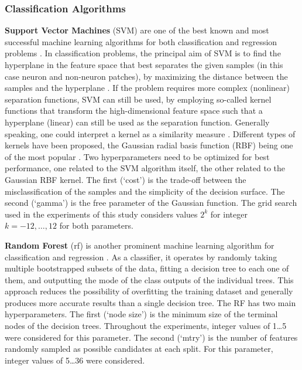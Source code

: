 \subsubsection{Classification Algorithms}
\label{subsubsec:classifiers}
{\bf Support Vector Machines} (SVM) are one of the best known and most successful machine learning algorithms for both classification and regression problems \cite{boser1992training, vapnik1998statistical, vapnik2013nature, bishop2006pattern}. In classification problems, the principal aim of SVM is to find the hyperplane in the feature space that best separates the given samples (in this case neuron and non-neuron patches), by maximizing the distance between the samples and the hyperplane \cite{burges1998tutorial}. If the problem requires more complex (nonlinear) separation functions, SVM can still be used, by employing so-called kernel functions that transform the high-dimensional feature space such that a hyperplane (linear) can still be used as the separation function. Generally speaking, one could interpret a kernel as a similarity measure \cite{vert2004primer}. Different types of kernels have been proposed, the Gaussian radial basis function (RBF) being one of the most popular \cite{cristianini2000introduction}. Two hyperparameters need to be optimized for best performance, one related to the SVM algorithm itself, the other related to the Gaussian RBF kernel. The first (`cost') is the trade-off between the misclassification of the samples and the simplicity of the decision surface. The second (`gamma') is the free parameter of the Gaussian function. The grid search used in the experiments of this study considers values $2^k$ for integer $k=-12,\dots,12$ for both parameters.

{\bf Random Forest} (\gls{rf}) is another prominent machine learning algorithm for classification and regression \cite{breiman2001random}. As a classifier, it operates by randomly taking multiple bootstrapped subsets of the data, fitting a decision tree to each one of them, and outputting the mode of the class outputs of the individual trees. This approach reduces the possibility of overfitting the training dataset and generally produces more accurate results than a single decision tree. The RF has two main hyperparameters. The first (`node size') is the minimum size of the terminal nodes of the decision trees. Throughout the experiments, integer values of 1\dots5 were considered for this parameter. The second (`mtry') is the number of features randomly sampled as possible candidates at each split. For this parameter, integer values of 5\dots36 were considered.

